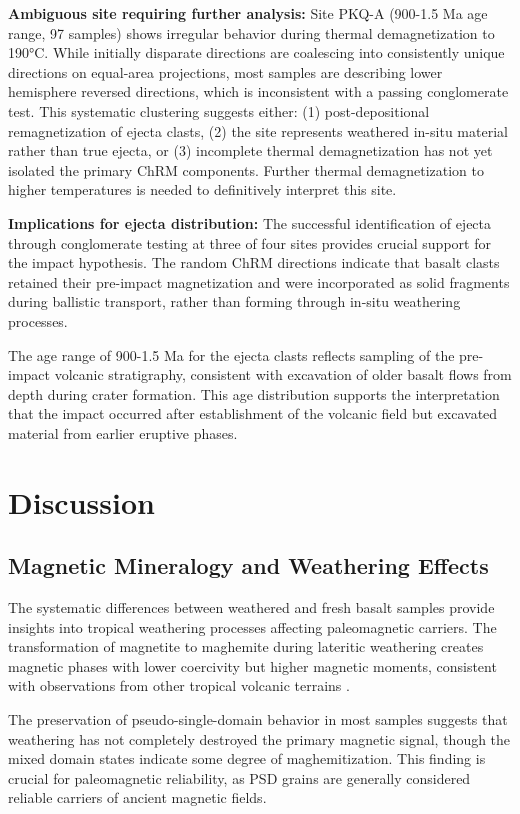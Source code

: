 \documentclass[twocolumn,11pt]{article}
\begin{document}
\textbf{Ambiguous site requiring further analysis:} Site PKQ-A (900-1.5 Ma age range, 97 samples) shows irregular behavior during thermal demagnetization to 190°C. While initially disparate directions are coalescing into consistently unique directions on equal-area projections, most samples are describing lower hemisphere reversed directions, which is inconsistent with a passing conglomerate test. This systematic clustering suggests either: (1) post-depositional remagnetization of ejecta clasts, (2) the site represents weathered in-situ material rather than true ejecta, or (3) incomplete thermal demagnetization has not yet isolated the primary ChRM components. Further thermal demagnetization to higher temperatures is needed to definitively interpret this site.

\textbf{Implications for ejecta distribution:} The successful identification of ejecta through conglomerate testing at three of four sites provides crucial support for the impact hypothesis. The random ChRM directions indicate that basalt clasts retained their pre-impact magnetization and were incorporated as solid fragments during ballistic transport, rather than forming through in-situ weathering processes.

The age range of 900-1.5 Ma for the ejecta clasts reflects sampling of the pre-impact volcanic stratigraphy, consistent with excavation of older basalt flows from depth during crater formation. This age distribution supports the interpretation that the impact occurred after establishment of the volcanic field but excavated material from earlier eruptive phases.

\section{Discussion}

\subsection{Magnetic Mineralogy and Weathering Effects}

The systematic differences between weathered and fresh basalt samples provide insights into tropical weathering processes affecting paleomagnetic carriers. The transformation of magnetite to maghemite during lateritic weathering creates magnetic phases with lower coercivity but higher magnetic moments, consistent with observations from other tropical volcanic terrains \citep{Ananthapadmanabha2014}.

The preservation of pseudo-single-domain behavior in most samples suggests that weathering has not completely destroyed the primary magnetic signal, though the mixed domain states indicate some degree of maghemitization. This finding is crucial for paleomagnetic reliability, as PSD grains are generally considered reliable carriers of ancient magnetic fields.
\end{document}
